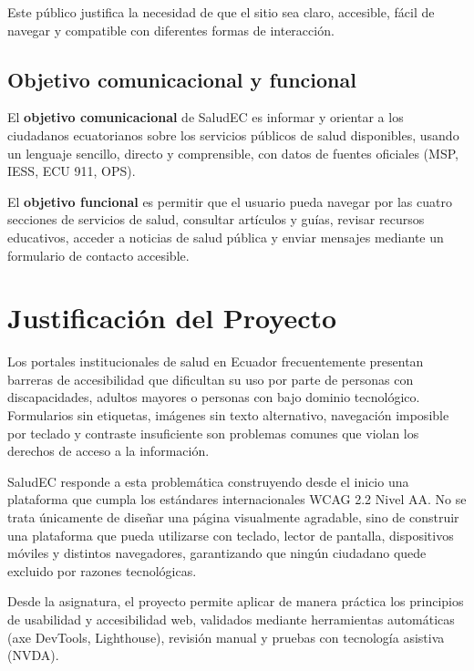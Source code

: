 \documentclass[12pt, a4paper]{article}
\begin{document}
Este público justifica la necesidad de que el sitio sea claro, accesible, fácil de navegar y compatible con diferentes formas de interacción.

\subsection{Objetivo comunicacional y funcional}

El \textbf{objetivo comunicacional} de SaludEC es informar y orientar a los ciudadanos ecuatorianos sobre los servicios públicos de salud disponibles, usando un lenguaje sencillo, directo y comprensible, con datos de fuentes oficiales (MSP, IESS, ECU 911, OPS).

El \textbf{objetivo funcional} es permitir que el usuario pueda navegar por las cuatro secciones de servicios de salud, consultar artículos y guías, revisar recursos educativos, acceder a noticias de salud pública y enviar mensajes mediante un formulario de contacto accesible.

\section{Justificación del Proyecto}

Los portales institucionales de salud en Ecuador frecuentemente presentan barreras de accesibilidad que dificultan su uso por parte de personas con discapacidades, adultos mayores o personas con bajo dominio tecnológico. Formularios sin etiquetas, imágenes sin texto alternativo, navegación imposible por teclado y contraste insuficiente son problemas comunes que violan los derechos de acceso a la información.

SaludEC responde a esta problemática construyendo desde el inicio una plataforma que cumpla los estándares internacionales WCAG 2.2 Nivel AA. No se trata únicamente de diseñar una página visualmente agradable, sino de construir una plataforma que pueda utilizarse con teclado, lector de pantalla, dispositivos móviles y distintos navegadores, garantizando que ningún ciudadano quede excluido por razones tecnológicas.

Desde la asignatura, el proyecto permite aplicar de manera práctica los principios de usabilidad y accesibilidad web, validados mediante herramientas automáticas (axe DevTools, Lighthouse), revisión manual y pruebas con tecnología asistiva (NVDA).

\end{document}

